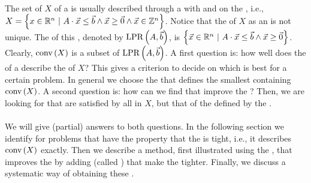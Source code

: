 \paragraph{}
The set of  $X$ of a  is usually described through a  with  and  on the , i.e., $X=\left\{ x\in\mathbb{R}^n\ |\ A\cdot\vec{x}\leq\vec{b}\wedge\vec{x}\geq\vec{0}\wedge\vec{x}\in\mathbb{Z}^n \right\}$. Notice that the  of $X$ as an  is not unique. The  of this , denoted by $\mbox{LPR}\left( A,\vec{b} \right)$, is $\left\{ \vec{x}\in\mathbb{R}^n\ |\ A\cdot\vec{x}\leq\vec{b}\wedge\vec{x}\geq\vec{0} \right\}$. Clearly, $\mbox{conv}\left( X \right)$ is a subset of $\mbox{LPR}\left( A,\vec{b} \right)$. A first question is: how well does the  of a  describe the  of $X$? This gives a criterion to decide on which  is best for a certain problem. In general we choose the  that defines the smallest  containing $\mbox{conv}\left( X \right)$. A second question is: how can we find  that improve the ? Then, we are looking for  that are satisfied by all  in $X$, but that  of the  defined by the .

\paragraph{}
We will give (partial) answers to both questions. In the following section we identify  for problems that have the property that the  is tight, i.e., it describes $\mbox{conv}\left( X \right)$ exactly. Then we describe a method, first illustrated using the , that improves the  by adding  (called ) that make the  tighter. Finally, we discuss a systematic way of obtaining these .


